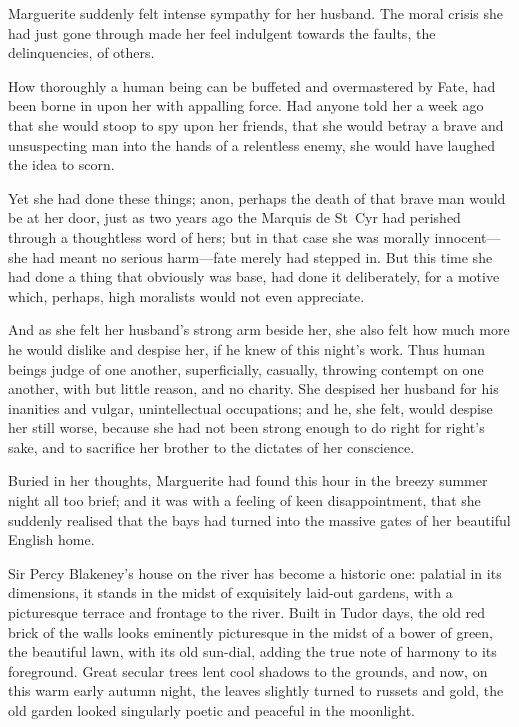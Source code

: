 Marguerite suddenly felt intense sympathy for her husband. The moral crisis she had just gone through made her feel indulgent towards the faults, the delinquencies, of others.

How thoroughly a human being can be buffeted and overmastered by Fate, had been borne in upon her with appalling force. Had anyone told her a week ago that she would stoop to spy upon her friends, that she would betray a brave and unsuspecting man into the hands of a relentless enemy, she would have laughed the idea to scorn.

Yet she had done these things; anon, perhaps the death of that brave man would be at her door, just as two years ago the Marquis de St~Cyr had perished through a thoughtless word of hers; but in that case she was morally innocent—she had meant no serious harm—fate merely had stepped in. But this time she had done a thing that obviously was base, had done it deliberately, for a motive which, perhaps, high moralists would not even appreciate.

And as she felt her husband's strong arm beside her, she also felt how much more he would dislike and despise her, if he knew of this night's work. Thus human beings judge of one another, superficially, casually, throwing contempt on one another, with but little reason, and no charity. She despised her husband for his inanities and vulgar, unintellectual occupations; and he, she felt, would despise her still worse, because she had not been strong enough to do right for right's sake, and to sacrifice her brother to the dictates of her conscience.

Buried in her thoughts, Marguerite had found this hour in the breezy summer night all too brief; and it was with a feeling of keen disappointment, that she suddenly realised that the bays had turned into the massive gates of her beautiful English home.

Sir Percy Blakeney's house on the river has become a historic one: palatial in its dimensions, it stands in the midst of exquisitely laid-out gardens, with a picturesque terrace and frontage to the river. Built in Tudor days, the old red brick of the walls looks eminently picturesque in the midst of a bower of green, the beautiful lawn, with its old sun-dial, adding the true note of harmony to its foreground. Great secular trees lent cool shadows to the grounds, and now, on this warm early autumn night, the leaves slightly turned to russets and gold, the old garden looked singularly poetic and peaceful in the moonlight.

